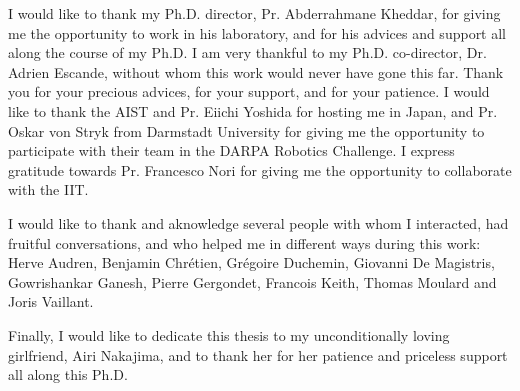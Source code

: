 
\begin{acknowledgements}

I would like to thank my Ph.D. director, Pr. Abderrahmane Kheddar, for giving me the opportunity to work in his laboratory, and for his advices and support all along the course of my Ph.D.
I am very thankful to my Ph.D. co-director, Dr. Adrien Escande, without whom this work would never have gone this far.
Thank you for your precious advices, for your support, and for your patience.
I would like to thank the AIST and Pr. Eiichi Yoshida for hosting me in Japan,
and Pr. Oskar von Stryk from Darmstadt University for giving me the opportunity to participate with their team in the DARPA Robotics Challenge.
I express gratitude towards Pr. Francesco Nori for giving me the opportunity to collaborate with the IIT.

I would like to thank and aknowledge several people with whom I interacted, had fruitful conversations, and who helped me in different ways during this work:
Herve Audren,
Benjamin Chr\'etien,
Gr\'egoire Duchemin,
Giovanni De Magistris,
Gowrishankar Ganesh,
Pierre Gergondet,
Francois Keith,
Thomas Moulard and
Joris Vaillant.

Finally, I would like to dedicate this thesis to my unconditionally loving girlfriend, Airi Nakajima, and to thank her for her patience and priceless support all along this Ph.D.

\end{acknowledgements}
